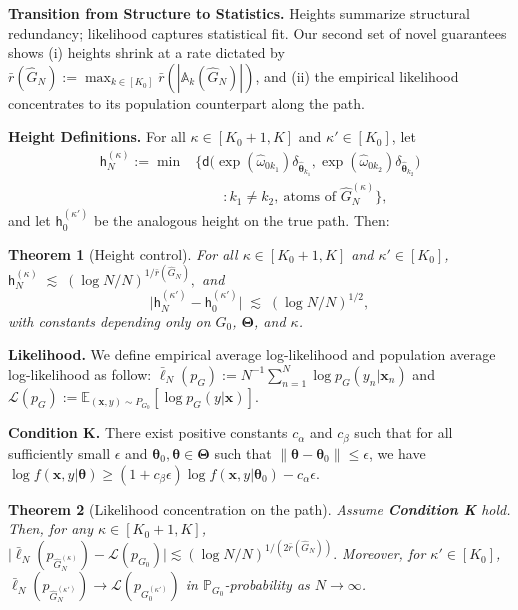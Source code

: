 \documentclass[twoside]{article}
\newcommand{\divclus}{\mathsf{d}}
\newcommand{\height}{\mathsf{h}}
\theoremstyle{plain}
\newtheorem{theorem}{Theorem}
\theoremstyle{definition}
\theoremstyle{plain}
\def\rvx{{\mathbf{x}}}
\def\vtheta{{\bm{\theta}}}
\def\vTheta{{\bm{\Theta}}}
\def\vx{{\bm{x}}}
\def\sA{{\mathbb{A}}}
\def\sP{{\mathbb{P}}}
\newcommand{\E}{\mathbb{E}}
\newcommand{\cL}{\mathcal{L}}
\newcommand{\norm}[1]{\|#1\|}
\begin{document}
{\bf Transition from Structure to Statistics.}
Heights summarize structural redundancy; likelihood captures statistical fit. Our second set of novel guarantees shows (i) heights shrink at a rate dictated by $\bar r(\widehat G_N) := \max_{k \in [K_0]} \bar{r}(|\sA_k (\widehat G_N)|)$, and (ii) the empirical likelihood concentrates to its population counterpart along the path.

{\bf Height Definitions.}
For all $\kappa\in[K_0+1,K]$ and $\kappa'\in[K_0]$, let
\begin{align}
    \height_N^{(\kappa)}:=\min&\Big\{\divclus\!\big(\exp(\widehat\omega_{0k_1})\delta_{\widehat\vtheta_{k_1}},
\exp(\widehat\omega_{0k_2})\delta_{\widehat\vtheta_{k_2}}\big) \nonumber \\
    &\qquad: k_1\neq k_2,\ \text{atoms of }\widehat G_N^{(\kappa)}\Big\},
\end{align}
and let $\height_0^{(\kappa')}$ be the analogous height on the true path. Then:
\begin{theorem}[Height control]
\label{thm:heights}
For all $\kappa\in[K_0+1,K]$ and $\kappa'\in[K_0]$, $\height_N^{(\kappa)}\;\lesssim\;(\log N/N)^{1/\bar r(\widehat G_N)},$ and
\[
\big|\height_N^{(\kappa')}-\height_0^{(\kappa')}\big|\;\lesssim\;(\log N/N)^{1/2},
\]
with constants depending only on $G_0$, $\vTheta$, and $\kappa$.
\end{theorem}

{\bf Likelihood.}
We define empirical average log-likelihood and population average log-likelihood as follow: $\bar\ell_N(p_G):=N^{-1}\sum_{n=1}^N\log p_G(y_n| \rvx_n)$ and $\cL(p_G):=\E_{(\rvx,y)\sim P_{G_0}}[\log p_G(y| \vx)]$.

\textbf{Condition K.} There exist positive constants $c_{\alpha}$ and $c_{\beta}$ such that for all sufficiently small $\epsilon$ and $\vtheta_0, \vtheta \in \vTheta$ such that $\norm{\vtheta - \vtheta_0} \leq \epsilon$, we have $\log f(\vx, y|\vtheta) \geq (1 + c_{\beta} \epsilon) \log f(\vx, y|\vtheta_0) - c_{\alpha} \epsilon$.

\begin{theorem}[Likelihood concentration on the path]
\label{thm:likelihood_path}
Assume \textbf{Condition K} hold. Then, for any $\kappa\in[K_0+1,K]$,
\(
\big|\bar\ell_N(p_{\widehat G_N^{(\kappa)}})-\cL(p_{G_0})\big|\lesssim(\log N/N)^{1/(2\bar r(\widehat G_N))}.
\)
Moreover, for $\kappa'\in[K_0]$, $\bar\ell_N(p_{\widehat G_N^{(\kappa')}})\to \cL(p_{G_0^{(\kappa')}})$ in $\sP_{G_0}$-probability as $N\to\infty$.
\end{theorem}
\end{document}
